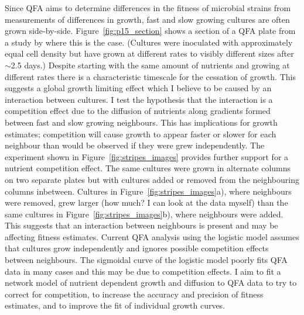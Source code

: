 Since QFA aims to determine differences in the fitness of microbial
strains from measurements of differences in growth, fast and slow
growing cultures are often grown
side-by-side. Figure~\ref{fig:p15_section} shows a section of a QFA
plate from a study by \citeauthor*{Addinall2011} where this is the
case. (Cultures were inoculated with approximately equal cell density
but have grown at different rates to visibly different sizes after
\(\sim\)2.5 days.) Despite starting with the same amount of nutrients
and growing at different rates there is a characteristic timescale for
the cessation of growth. This suggests a global growth limiting effect
which I believe to be caused by an interaction between cultures. I
test the hypothesis that the interaction is a competition effect due
to the diffusion of nutrients along gradients formed between fast and
slow growing neighbours. This has implications for growth estimates;
competition will cause growth to appear faster or slower for each
neighbour than would be observed if they were grew independently. The
experiment shown in Figure~\ref{fig:stripes_images} provides further
support for a nutrient competition effect. The same cultures were
grown in alternate columns on two separate plates but with cultures
added or removed from the neighbouring columns inbetween. Cultures in
Figure~\ref{fig:stripes_images}a), where neighbours were removed, grew
larger (how much? I can look at the data myself) than the same
cultures in Figure~\ref{fig:stripes_images}b), where neighbours were
added. This suggests that an interaction between neighbours is present
and may be affecting fitness estimates. Current QFA analysis using the
logistic model assumes that cultures grow independently and ignores
possible competition effects between neighbours. The sigmoidal curve
of the logistic model poorly fits QFA data in many cases and this may
be due to competition effects. I aim to fit a network model of
nutrient dependent growth and diffusion to QFA data to try to correct
for competition, to increase the accuracy and precision of fitness
estimates, and to improve the fit of individual growth curves.

